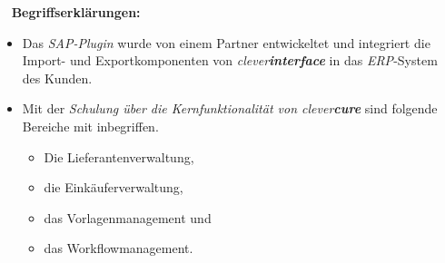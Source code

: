 \egroup
\ \newline
\newline
\textbf{Begriffserklärungen:}
\begin{itemize}
	\item Das \emph{SAP-Plugin} wurde von einem Partner entwickeltet und integriert die Import- und Exportkomponenten von \emph{clever\textbf{interface}} in das \emph{ERP}-System des Kunden.
	\item Mit der \emph{Schulung über die  Kernfunktionalität von clever\textbf{cure}} sind folgende Bereiche mit inbegriffen.
	\begin{itemize}
		\item Die Lieferantenverwaltung,
		\item die Einkäuferverwaltung,
		\item das Vorlagenmanagement und
		\item das Workflowmanagement.
	\end{itemize}
\end{itemize}
\newpage

